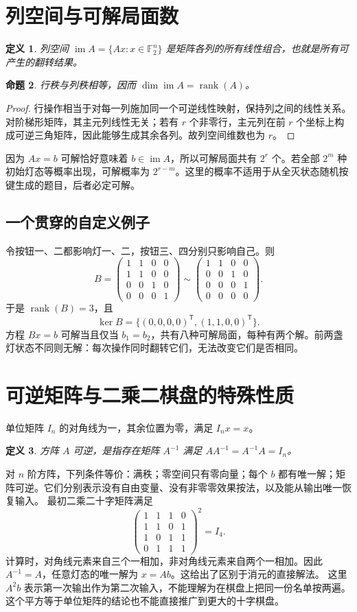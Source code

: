 \documentclass[UTF8,fontset=fandol,11pt,a4paper]{ctexart}
\newtheorem{definition}{定义}[section]
\newtheorem{proposition}[definition]{命题}
\newcommand{\F}{\mathbb F_2}
\newcommand{\rank}{\operatorname{rank}}
\newcommand{\im}{\operatorname{im}}
\begin{document}
\section{列空间与可解局面数}
\begin{definition}
列空间 $\im A=\{Ax:x\in\F^n\}$ 是矩阵各列的所有线性组合，也就是所有可产生的翻转结果。
\end{definition}
\begin{proposition}
行秩与列秩相等，因而 $\dim\im A=\rank(A)$。
\end{proposition}
\begin{proof}
行操作相当于对每一列施加同一个可逆线性映射，保持列之间的线性关系。对阶梯形矩阵，其主元列线性无关；若有 $r$ 个非零行，主元列在前 $r$ 个坐标上构成可逆三角矩阵，因此能够生成其余各列。故列空间维数也为 $r$。
\end{proof}
因为 $Ax=b$ 可解恰好意味着 $b\in\im A$，所以可解局面共有 $2^r$ 个。若全部 $2^m$ 种初始灯态等概率出现，可解概率为 $2^{r-m}$。这里的概率不适用于从全灭状态随机按键生成的题目，后者必定可解。
\subsection{一个贯穿的自定义例子}
令按钮一、二都影响灯一、二，按钮三、四分别只影响自己。则
\[
 B=\begin{pmatrix}1&1&0&0\\1&1&0&0\\0&0&1&0\\0&0&0&1\end{pmatrix}
 \sim\begin{pmatrix}1&1&0&0\\0&0&1&0\\0&0&0&1\\0&0&0&0\end{pmatrix}.
\]
于是 $\rank(B)=3$，且
\[\ker B=\{(0,0,0,0)^{\mathsf T},(1,1,0,0)^{\mathsf T}\}.\]
方程 $Bx=b$ 可解当且仅当 $b_1=b_2$，共有八种可解局面，每种有两个解。前两盏灯状态不同则无解：每次操作同时翻转它们，无法改变它们是否相同。
\section{可逆矩阵与二乘二棋盘的特殊性质}
单位矩阵 $I_n$ 的对角线为一，其余位置为零，满足 $I_nx=x$。
\begin{definition}
方阵 $A$ 可逆，是指存在矩阵 $A^{-1}$ 满足 $AA^{-1}=A^{-1}A=I_n$。
\end{definition}
对 $n$ 阶方阵，下列条件等价：满秩；零空间只有零向量；每个 $b$ 都有唯一解；矩阵可逆。它们分别表示没有自由变量、没有非零零效果按法，以及能从输出唯一恢复输入。
最初二乘二十字矩阵满足
\[
\begin{pmatrix}1&1&1&0\\1&1&0&1\\1&0&1&1\\0&1&1&1\end{pmatrix}^{\!2}=I_4.
\]
计算时，对角线元素来自三个一相加，非对角线元素来自两个一相加。因此 $A^{-1}=A$，任意灯态的唯一解为 $x=Ab$。这给出了区别于消元的直接解法。
这里 $A^2b$ 表示第一次输出作为第二次输入，不能理解为在棋盘上把同一份名单按两遍。这个平方等于单位矩阵的结论也不能直接推广到更大的十字棋盘。
\end{document}
